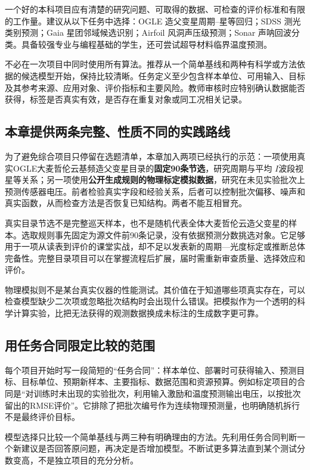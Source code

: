 一个好的本科项目应有清楚的研究问题、可取得的数据、可检查的评价标准和有限的工作量。建议从以下任务中选择：OGLE 造父变星周期--星等回归；SDSS 测光类别预测；Gaia 星团邻域候选识别；Airfoil 风洞声压级预测；Sonar 声呐回波分类。具备较强专业与编程基础的学生，还可尝试超导材料临界温度预测。

不必在一次项目中同时使用所有算法。推荐从一个简单基线和两种有科学或方法依据的候选模型开始，保持比较清晰。任务定义至少包含样本单位、可用输入、目标及其参考来源、应用对象、评价指标和主要风险。教师审核时应特别确认数据能否获得，标签是否真实有效，是否存在重复对象或同工况相关记录。


\subsection{本章提供两条完整、性质不同的实践路线}
为了避免综合项目只停留在选题清单，本章加入两项已经执行的示范：一项使用真实OGLE大麦哲伦云基频造父变星目录的\textbf{固定90条节选}，研究周期与平均 $I$波段视星等关系；另一项使用\textbf{公开生成规则的物理标定模拟数据}，研究在未见实验批次上预测传感器电压。前者检验真实字段和经验关系，后者可以控制批次偏移、噪声和真实函数，从而检查方法是否恢复已知结构。两者不能互相冒充。

真实目录节选不是完整巡天样本，也不是随机代表全体大麦哲伦云造父变星的样本。选取规则事先固定为源文件前90条记录，没有依据预测分数挑选对象。它足够用于一项从读表到评价的课堂实战，却不足以发表新的周期—光度标定或推断总体完备性。完整目录项目可以在掌握流程后扩展，届时需重新审查质量、选择效应和评价。

物理模拟则不是某台真实仪器的性能测试。其价值在于知道哪些项真实存在，可以检查模型缺少二次项或忽略批次结构时会出现什么错误。把模拟作为一个透明的科学计算实验，比把无法获得的观测数据换成未标注的生成数字更可靠。

\subsection{用任务合同限定比较的范围}
每个项目开始时写一段简短的“任务合同”：样本单位、部署时可获得输入、预测目标、目标单位、预期新样本、主要指标、数据范围和资源预算。例如标定项目的合同是“对训练时未出现的实验批次，利用输入激励和温度预测输出电压，以按批次留出的RMSE评价”。它排除了把批次编号作为连续物理预测量，也明确随机拆行不是最终评价目标。

模型选择只比较一个简单基线与两三种有明确理由的方法。先利用任务合同判断一个新建议是否回答原问题，再决定是否增加模型。不断试更多算法直到某个测试分数变高，不是独立项目的充分分析。

